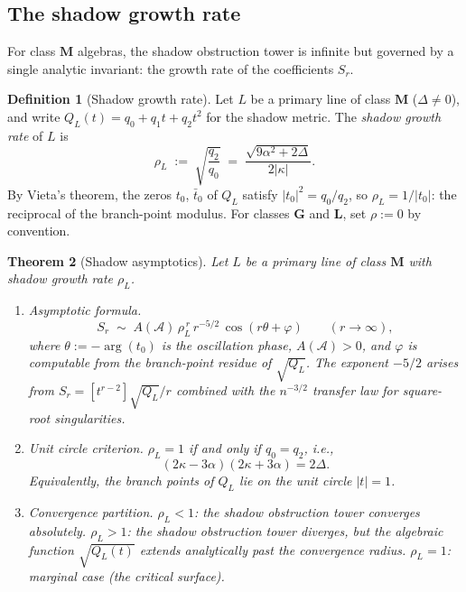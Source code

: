 \documentclass[11pt]{article}
\theoremstyle{plain}
\newtheorem{theorem}{Theorem}[section]
\theoremstyle{definition}
\newtheorem{definition}[theorem]{Definition}
\theoremstyle{remark}
\begin{document}
\subsection{The shadow growth rate}

For class $\mathbf{M}$ algebras, the shadow obstruction tower is infinite
but governed by a single analytic invariant: the growth rate of
the coefficients $S_r$.

\begin{definition}[Shadow growth rate]
\label{def:shadow-growth-rate}
Let $L$ be a primary line of class $\mathbf{M}$ ($\Delta \neq 0$),
and write $Q_L(t) = q_0 + q_1 t + q_2 t^2$ for the shadow metric.
The \emph{shadow growth rate} of $L$ is
\begin{equation}
\label{eq:shadow-growth-rate}
 \rho_L \;:=\; \sqrt{\frac{q_2}{q_0}}
 \;=\;
 \frac{\sqrt{9\alpha^2 + 2\Delta}}{2|\kappa|}.
\end{equation}
By Vieta's theorem, the zeros $t_0$, $\bar{t}_0$ of $Q_L$
satisfy $|t_0|^2 = q_0/q_2$, so
$\rho_L = 1/|t_0|$: the reciprocal of the branch-point modulus.
For classes $\mathbf{G}$ and $\mathbf{L}$, set $\rho := 0$
by convention.
\end{definition}

\begin{theorem}[Shadow asymptotics]
\label{thm:shadow-asymptotics}
Let $L$ be a primary line of class $\mathbf{M}$ with shadow
growth rate $\rho_L$.
\begin{enumerate}[label=\textup{(\roman*)}]
\item \emph{Asymptotic formula.}
 \begin{equation}
 \label{eq:shadow-asymptotic-formula}
 S_r \;\sim\; A(\mathcal{A})\,\rho_L^{\,r}\,r^{-5/2}\,
 \cos(r\theta + \varphi)
 \qquad (r \to \infty),
 \end{equation}
 where $\theta := -\arg(t_0)$ is the oscillation phase,
 $A(\mathcal{A}) > 0$, and $\varphi$ is computable from the
 branch-point residue of $\sqrt{Q_L}$. The exponent $-5/2$
 arises from $S_r = [t^{r-2}]\sqrt{Q_L}/r$ combined with the
 $n^{-3/2}$ transfer law for square-root singularities.

\item \emph{Unit circle criterion.}
 $\rho_L = 1$ if and only if $q_0 = q_2$, i.e.,
 \begin{equation}
 \label{eq:unit-circle-criterion}
 (2\kappa - 3\alpha)(2\kappa + 3\alpha) = 2\Delta.
 \end{equation}
 Equivalently, the branch points of $Q_L$ lie on the unit
 circle $|t| = 1$.

\item \emph{Convergence partition.}
 $\rho_L < 1$: the shadow obstruction tower converges
 absolutely.
 $\rho_L > 1$: the shadow obstruction tower diverges, but the algebraic
 function $\sqrt{Q_L(t)}$ extends analytically past the
 convergence radius.
 $\rho_L = 1$: marginal case (the critical surface).
\end{enumerate}
\end{theorem}
\end{document}
